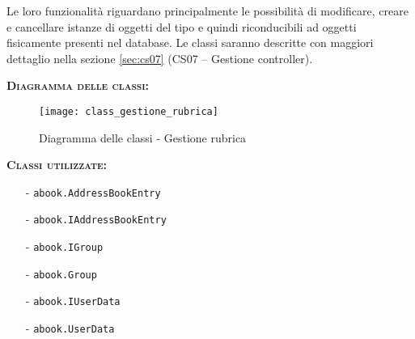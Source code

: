\begin{description}
Le loro funzionalità riguardano principalmente le possibilità di modificare, creare e cancellare istanze di oggetti del tipo  e quindi riconducibili ad oggetti fisicamente presenti nel database. Le classi  saranno descritte con maggiori dettaglio nella sezione \vref{sec:cs07} (\textsf{CS07 -- Gestione controller}).

	\item{\scshape\bfseries Diagramma delle classi:}
\begin{figure}[H]
  \centering
  \texttt{[image: class\_gestione\_rubrica]}
  \caption{Diagramma delle classi - Gestione rubrica}\label{fig:gestionerubrica}
\end{figure}
	
	\item{\scshape\bfseries Classi utilizzate:}\\
	\begin{itemize}[nolistsep, noitemsep]
	  \item[-] \texttt{abook.AddressBookEntry}
	  \item[-] \texttt{abook.IAddressBookEntry}
	  \item[-] \texttt{abook.IGroup}
	  \item[-] \texttt{abook.Group}
	  \item[-] \texttt{abook.IUserData}
	  \item[-] \texttt{abook.UserData}
	\end{itemize}
\end{description}


